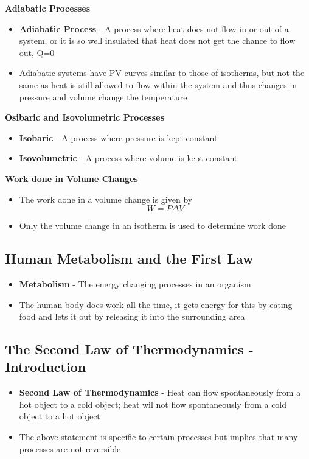 \textbf{Adiabatic Processes}
\begin{itemize}
    \item \textbf{Adiabatic Process} - A process where heat does not flow in or out of a system, or it is so well insulated that heat does not get the chance to flow out, Q=0
    \item Adiabatic systems have PV curves similar to those of isotherms, but not the same as heat is still allowed to flow within the system and thus changes in pressure and volume change the temperature
\end{itemize}

\textbf{Osibaric and Isovolumetric Processes} 
\begin{itemize}
    \item \textbf{Isobaric} -  A process where pressure is kept constant
    \item \textbf{Isovolumetric} - A process where volume is kept constant
\end{itemize}

\textbf{Work done in Volume Changes}
\begin{itemize}
    \item The work done in a volume change is given by \[W=P\Delta V\]
    \item Only the volume change in an isotherm is used to determine work done
\end{itemize}


\subsection{Human Metabolism and the First Law}
\begin{itemize}
    \item \textbf{Metabolism} - The energy changing processes in an organism
    \item The human body does work all the time, it gets energy for this by eating food and lets it out by releasing it into the surrounding area
\end{itemize}

\subsection{The Second Law of Thermodynamics - Introduction}
\begin{itemize}
    \item \textbf{Second Law of Thermodynamics} - Heat can flow spontaneously from a hot object to a cold object; heat wil not flow spontaneously from a cold object to a hot object
    \item The above statement is specific to certain processes but implies that many processes are not reversible
\end{itemize}


